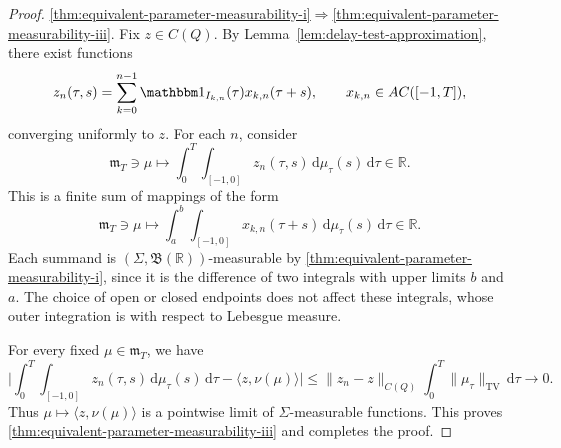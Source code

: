 \documentclass[10pt,a4paper]{amsart}
\newcommand\RR{\ensuremath{\mathbb{R}}}
\newcommand{\dd}{\ensuremath{\mathrm{d}}}
\begin{document}
\begin{proof}
\medskip
\noindent
\ref{thm:equivalent-parameter-measurability-i}$\Rightarrow$\ref{thm:equivalent-parameter-measurability-iii}.
Fix $z\in C(Q)$.
By Lemma~\ref{lem:delay-test-approximation}, there exist
functions
\begin{equation*}
    z_n(\tau,s)
    =
    \sum_{k=0}^{n-1}
    \mathbbm 1_{I_{k,n}}(\tau)x_{k,n}(\tau+s),
    \qquad x_{k,n}\in AC([-1,T]),
\end{equation*}
converging uniformly to $z$. For each $n$, consider
\begin{equation*}
     \mathfrak{m}_T\ni \mu\mapsto
    \int_0^T\int_{[-1,0]}
    z_n(\tau,s)\,\dd\mu_\tau(s)\,\dd\tau \in \RR.
\end{equation*}
This is a finite sum of mappings of the form
\begin{equation*}
     \mathfrak{m}_T\ni \mu\mapsto
    \int_a^b\int_{[-1,0]}
    x_{k,n}(\tau+s)\,\dd\mu_\tau(s)\,\dd\tau\in \RR.
\end{equation*}
Each summand is $(\Sigma,\mathfrak B(\RR))$-measurable by \ref{thm:equivalent-parameter-measurability-i}, since it
is the difference of two integrals with upper limits
$b$ and $a$. The choice of open or closed endpoints
does not affect these integrals, whose outer integration
is with respect to Lebesgue measure.

For every fixed $\mu\in\mathfrak m_T$, we have
\begin{equation*}
    \Big|
            \int_0^T\int_{[-1,0]}
            z_n(\tau,s)\,\dd\mu_\tau(s)\,\dd\tau
            -
            \langle z,\nu(\mu)\rangle
        \Big|
        \le
        \|z_n-z\|_{C(Q)}
        \int_0^T\|\mu_\tau\|_{\mathrm{TV}}\,\dd\tau
        \to0.
\end{equation*}
Thus $\mu\mapsto\langle z,\nu(\mu)\rangle$ is a pointwise
limit of $\Sigma$-measurable functions.
This proves \ref{thm:equivalent-parameter-measurability-iii} and completes the proof.
\end{proof}
\end{document}
